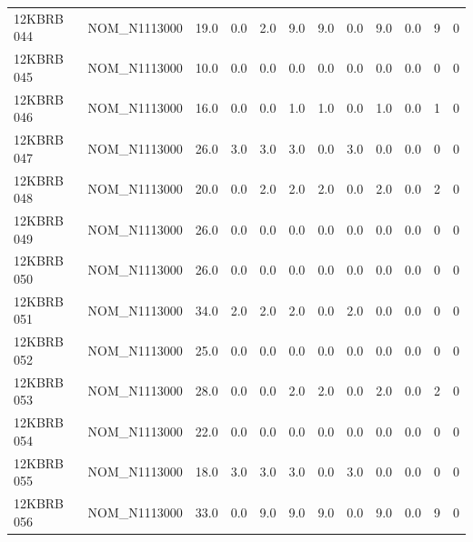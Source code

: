 \begin{table}[htbp]
\begin{tabular}{llllllllllll}
12KBRB 044 & NOM\_N1113000 & 19.0 & 0.0 & 2.0 & 9.0 & 9.0 & 0.0 & 9.0 & 0.0 & 9 & 0 \\
12KBRB 045 & NOM\_N1113000 & 10.0 & 0.0 & 0.0 & 0.0 & 0.0 & 0.0 & 0.0 & 0.0 & 0 & 0 \\
12KBRB 046 & NOM\_N1113000 & 16.0 & 0.0 & 0.0 & 1.0 & 1.0 & 0.0 & 1.0 & 0.0 & 1 & 0 \\
12KBRB 047 & NOM\_N1113000 & 26.0 & 3.0 & 3.0 & 3.0 & 0.0 & 3.0 & 0.0 & 0.0 & 0 & 0 \\
12KBRB 048 & NOM\_N1113000 & 20.0 & 0.0 & 2.0 & 2.0 & 2.0 & 0.0 & 2.0 & 0.0 & 2 & 0 \\
12KBRB 049 & NOM\_N1113000 & 26.0 & 0.0 & 0.0 & 0.0 & 0.0 & 0.0 & 0.0 & 0.0 & 0 & 0 \\
12KBRB 050 & NOM\_N1113000 & 26.0 & 0.0 & 0.0 & 0.0 & 0.0 & 0.0 & 0.0 & 0.0 & 0 & 0 \\
12KBRB 051 & NOM\_N1113000 & 34.0 & 2.0 & 2.0 & 2.0 & 0.0 & 2.0 & 0.0 & 0.0 & 0 & 0 \\
12KBRB 052 & NOM\_N1113000 & 25.0 & 0.0 & 0.0 & 0.0 & 0.0 & 0.0 & 0.0 & 0.0 & 0 & 0 \\
12KBRB 053 & NOM\_N1113000 & 28.0 & 0.0 & 0.0 & 2.0 & 2.0 & 0.0 & 2.0 & 0.0 & 2 & 0 \\
12KBRB 054 & NOM\_N1113000 & 22.0 & 0.0 & 0.0 & 0.0 & 0.0 & 0.0 & 0.0 & 0.0 & 0 & 0 \\
12KBRB 055 & NOM\_N1113000 & 18.0 & 3.0 & 3.0 & 3.0 & 0.0 & 3.0 & 0.0 & 0.0 & 0 & 0 \\
12KBRB 056 & NOM\_N1113000 & 33.0 & 0.0 & 9.0 & 9.0 & 9.0 & 0.0 & 9.0 & 0.0 & 9 & 0 \\
\bottomrule
\end{tabular}
\end{table}

